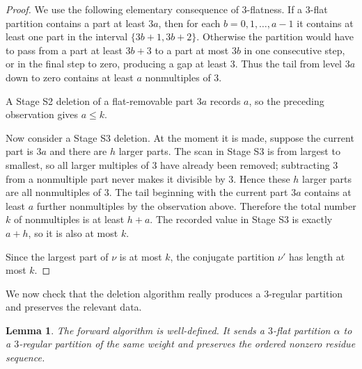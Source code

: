 \documentclass[11pt]{amsart}
\newtheorem{lemma}[theorem]{Lemma}
\theoremstyle{definition}
\theoremstyle{remark}
\begin{document}
\begin{proof}
We use the following elementary consequence of $3$-flatness.  If a $3$-flat
partition contains a part at least $3a$, then for each
$b=0,1,\ldots,a-1$ it contains at least one part in the interval
$\{3b+1,3b+2\}$.  Otherwise the partition would have to pass from a part at
least $3b+3$ to a part at most $3b$ in one consecutive step, or in the final
step to zero, producing a gap at least $3$.  Thus the tail from level $3a$ down
to zero contains at least $a$ nonmultiples of $3$.

A Stage S2 deletion of a flat-removable part $3a$ records $a$, so the preceding
observation gives $a\le k$.

Now consider a Stage S3 deletion.  At the moment it is made, suppose the current
part is $3a$ and there are $h$ larger parts.  The scan in Stage S3 is from
largest to smallest, so all larger multiples of $3$ have already been removed;
subtracting $3$ from a nonmultiple part never makes it divisible by $3$.  Hence
these $h$ larger parts are all nonmultiples of $3$.  The tail beginning with the
current part $3a$ contains at least $a$ further nonmultiples by the observation
above.  Therefore the total number $k$ of nonmultiples is at least $h+a$.  The
recorded value in Stage S3 is exactly $a+h$, so it is also at most $k$.

Since the largest part of $\nu$ is at most $k$, the conjugate partition $\nu'$ has
length at most $k$.
\end{proof}
We now check that the deletion algorithm really produces a $3$-regular partition and preserves the relevant data.

\begin{lemma}\label{lem:phi-forward-well}
The forward algorithm is well-defined.  It sends a $3$-flat partition $\alpha$ to a $3$-regular partition of the same weight and preserves the ordered nonzero residue sequence.
\end{lemma}
\end{document}

